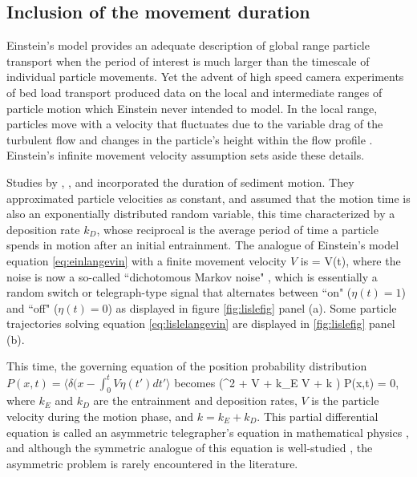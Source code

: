 \subsection{ Inclusion of the movement duration}
\label{sec:lisle}

Einstein's model provides an adequate description of global range particle transport when the period of interest is much larger than the timescale of individual particle movements. 
Yet the advent of high speed camera experiments of bed load transport produced data on the local and intermediate ranges of particle motion \citep{Abbott1970,Francis1972,Drake1988} which Einstein never intended to model.
In the local range, particles move with a velocity that fluctuates due to the variable drag of the turbulent flow \citep{Lajeunesse2010,Fathel2015} and changes in the particle's height within the flow profile \citep{VanRijn1984,Wiberg1985}. Einstein's infinite movement velocity assumption sets aside these details.

Studies by \citet{Gordon1972}, \citet{Lisle1998}, and \citet{Lajeunesse2017} incorporated the duration of sediment motion. They approximated particle velocities as constant, and assumed that the motion time is also an exponentially distributed random variable, this time characterized by a deposition rate $k_D$, whose reciprocal is the average period of time a particle spends in motion after an initial entrainment.
The analogue of Einstein's model equation \ref{eq:einlangevin} with a finite movement velocity $V$ is 
\be {} = V\eta(t), \ee
where the noise is now a so-called ``dichotomous Markov noise" \citep{Bena2006}, which is essentially a random switch or telegraph-type signal that alternates between ``on" ($\eta(t) = 1$) and ``off" ($\eta(t) = 0$) \citep{Cox1965,Horsthemke1984, Masoliver1991, Masoliver1996} as displayed in figure \ref{fig:lislefig} panel (a). Some particle trajectories solving equation \ref{eq:lislelangevin} are displayed in \ref{fig:lislefig} panel (b).

This time, the governing equation of the position probability distribution $P(x,t) = \langle \delta(x-\int_0^t V\eta(t')dt' \rangle$ becomes \citep{Balakrishnan1993}
\be \big(\pt^2 + V \px \pt + k_E V \px + k \pt \big) P(x,t) = 0,\ee
where $k_E$ and $k_D$ are the entrainment and deposition rates, $V$ is the particle velocity during the motion phase, and $k = k_E+k_D$. This partial differential equation is called an asymmetric telegrapher's equation in mathematical physics \citep{Rossetto2018}, and although the symmetric analogue of this equation is well-studied \citep{Weiss2002a, Masoliver2017}, the asymmetric problem is rarely encountered in the literature.


